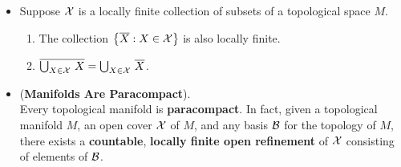 \documentclass[11pt]{article}
\begin{document}
\begin{itemize}
\item \begin{lemma}
Suppose ${\mathcal X}$ is a locally finite collection of subsets of a topological space $M$.
\begin{enumerate}
\item The collection $\left\{\overline{X}: X \in {\mathcal X}\right\}$ is also locally finite.
\item $\overline{\bigcup_{X \in {\mathcal X}}\,X} = \bigcup_{X \in {\mathcal X}}\,\overline{X}$.
\end{enumerate}
\end{lemma}

\item \begin{theorem} (\textbf{Manifolds Are Paracompact}).\\
Every topological manifold is \textbf{paracompact}. In fact, given a topological manifold $M$, an open cover ${\mathcal X}$ of $M$, and any basis ${\mathcal B}$ for the topology of $M$, there exists a \textbf{countable}, \textbf{locally finite open refinement} of ${\mathcal X}$ consisting of elements of ${\mathcal B}$.
\end{theorem}
\end{itemize}
\end{document}
